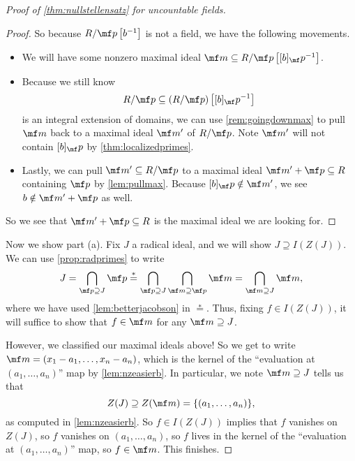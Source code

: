 \documentclass[../notes.tex]{subfiles}
\begin{document}
\begin{proof}[Proof of \autoref{thm:nullstellensatz} for uncountable fields]
\begin{proof}
		So because $R/\mf p\left[b^{-1}\right]$ is not a field, we have the following movements.
		\begin{itemize}
			\item We will have some nonzero maximal ideal $\mf m\subseteq R/\mf p\left[[b]_\mf p^{-1}\right]$.
			\item Because we still know
			\[R/\mf p\subseteq(R/\mf p)\left[[b]_\mf p^{-1}\right]\]
			is an integral extension of domains, we can use \autoref{rem:goingdownmax} to pull $\mf m$ back to a maximal ideal $\mf m'$ of $R/\mf p$. Note $\mf m'$ will not contain $[b]_\mf p$ by \autoref{thm:localizedprimes}.
			\item Lastly, we can pull $\mf m'\subseteq R/\mf p$ to a maximal ideal $\mf m'+\mf p\subseteq R$ containing $\mf p$ by \autoref{lem:pullmax}. Because $[b]_\mf p\notin\mf m'$, we see $b\notin\mf m'+\mf p$ as well.
		\end{itemize}
		So we see that $\mf m'+\mf p\subseteq R$ is the maximal ideal we are looking for.
	\end{proof}
	Now we show part (a). Fix $J$ a radical ideal, and we will show $J\supseteq I(Z(J))$. We can use \autoref{prop:radprimes} to write
	\[J=\bigcap_{\mf p\supseteq J}\mf p\stackrel*=\bigcap_{\mf p\supseteq J}\bigcap_{\mf m\supseteq\mf p}\mf m=\bigcap_{\mf m\supseteq J}\mf m,\]
	where we have used \autoref{lem:betterjacobson} in $\stackrel*=$. Thus, fixing $f\in I(Z(J))$, it will suffice to show that $f\in\mf m$ for any $\mf m\supseteq J$.
	
	However, we classified our maximal ideals above! So we get to write $\mf m=(x_1-a_1,\ldots,x_n-a_n)$, which is the kernel of the ``evaluation at $(a_1,\ldots,a_n)$'' map by \autoref{lem:nzeasierb}. In particular, we note $\mf m\supseteq J$ tells us that
	\[Z(J)\supseteq Z(\mf m)=\{(a_1,\ldots,a_n)\},\]
	as computed in \autoref{lem:nzeasierb}. So $f\in I(Z(J))$ implies that $f$ vanishes on $Z(J)$, so $f$ vanishes on $(a_1,\ldots,a_n)$, so $f$ lives in the kernel of the ``evaluation at $(a_1,\ldots,a_n)$'' map, so $f\in\mf m$. This finishes.
\end{proof}
\end{document}
